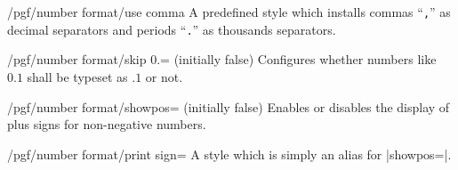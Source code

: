 \begin{key}{/pgf/number format/use comma}
  A predefined style which installs commas ``\texttt{,}'' as decimal
  separators and periods ``\texttt{.}'' as thousands separators. 

\begin{codeexample}[]
\end{codeexample}
\begin{codeexample}[]
\end{codeexample}
\end{key}

\begin{key}{/pgf/number format/skip 0.= (initially false)}
  Configures whether numbers like $0.1$ shall be typeset as $.1$ or
  not. 
\begin{codeexample}[]
\end{codeexample}
\begin{codeexample}[]
\end{codeexample}
\end{key}

\begin{key}{/pgf/number format/showpos= (initially false)}
  Enables or disables the display of plus signs for non-negative
  numbers. 
\begin{codeexample}[]
\end{codeexample}

\begin{codeexample}[]
\end{codeexample}

\begin{codeexample}[]
\end{codeexample}
\end{key}

\begin{stylekey}{/pgf/number format/print sign=}
  A style which is simply an alias for |showpos=|. 
\end{stylekey}

